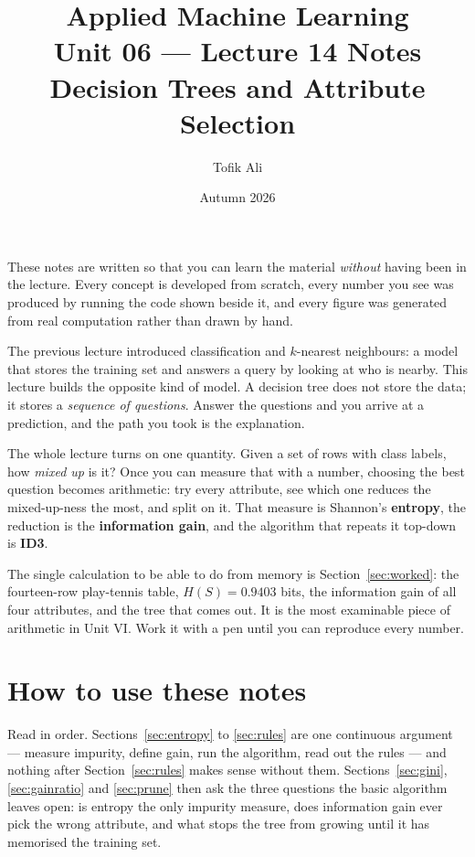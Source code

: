 \documentclass[11pt]{article}
\title{Applied Machine Learning\\Unit 06 --- Lecture 14 Notes\\
       Decision Trees and Attribute Selection}
\author{Tofik Ali}
\date{Autumn 2026}
\begin{document}
\maketitle

\begin{keyidea}
These notes are written so that you can learn the material \emph{without}
having been in the lecture. Every concept is developed from scratch, every
number you see was produced by running the code shown beside it, and every
figure was generated from real computation rather than drawn by hand.

The previous lecture introduced classification and $k$-nearest neighbours: a
model that stores the training set and answers a query by looking at who is
nearby. This lecture builds the opposite kind of model. A decision tree does
not store the data; it stores a \emph{sequence of questions}. Answer the
questions and you arrive at a prediction, and the path you took is the
explanation.

The whole lecture turns on one quantity. Given a set of rows with class
labels, how \emph{mixed up} is it? Once you can measure that with a number,
choosing the best question becomes arithmetic: try every attribute, see which
one reduces the mixed-up-ness the most, and split on it. That measure is
Shannon's \textbf{entropy}, the reduction is the \textbf{information gain}, and
the algorithm that repeats it top-down is \textbf{ID3}.

The single calculation to be able to do from memory is
Section~\ref{sec:worked}: the fourteen-row play-tennis table, $H(S) = 0.9403$
bits, the information gain of all four attributes, and the tree that comes out.
It is the most examinable piece of arithmetic in Unit VI. Work it with a pen
until you can reproduce every number.
\end{keyidea}

\tableofcontents
\medskip

\section{How to use these notes}
\label{sec:how}

Read in order. Sections~\ref{sec:entropy} to \ref{sec:rules} are one
continuous argument --- measure impurity, define gain, run the algorithm, read
out the rules --- and nothing after Section~\ref{sec:rules} makes sense
without them. Sections~\ref{sec:gini}, \ref{sec:gainratio} and \ref{sec:prune}
then ask the three questions the basic algorithm leaves open: is entropy the
only impurity measure, does information gain ever pick the wrong attribute,
and what stops the tree from growing until it has memorised the training set.
\end{document}
